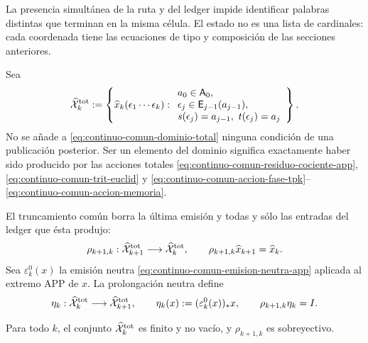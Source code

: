 La presencia simultánea de la ruta y del ledger impide identificar palabras
distintas que terminan en la misma célula.  El estado no es una lista de
cardinales: cada coordenada tiene las ecuaciones de tipo y composición de las
secciones anteriores.

\begin{definition}
\label{def:continuo-comun-dominio-total}
Sea
\begin{equation}
\label{eq:continuo-comun-dominio-total}
 \widehat{\mathcal X}^{\rm tot}_k
 :=\left\{
  \widehat x_k(\epsilon_1\cdots\epsilon_k):
  \begin{array}{l}
   a_0\in\mathsf A_0,\\
   \epsilon_j\in\mathsf E_{j-1}(a_{j-1}),\\
   s(\epsilon_j)=a_{j-1},\ t(\epsilon_j)=a_j
  \end{array}
 \right\}.
\end{equation}
No se añade a \eqref{eq:continuo-comun-dominio-total} ninguna condición de
una publicación posterior.  Ser un elemento del dominio significa
exactamente haber sido producido por las acciones totales
\eqref{eq:continuo-comun-residuo-cociente-app},
\eqref{eq:continuo-comun-trit-euclid} y
\eqref{eq:continuo-comun-accion-fase-tpk}--
\eqref{eq:continuo-comun-accion-memoria}.
\end{definition}

El truncamiento común borra la última emisión y todas y sólo las entradas del
ledger que ésta produjo:
\begin{equation}
\label{eq:continuo-comun-truncamiento-total}
 \rho_{k+1,k}:\widehat{\mathcal X}^{\rm tot}_{k+1}
 \longrightarrow\widehat{\mathcal X}^{\rm tot}_k,
 \qquad
 \rho_{k+1,k}\widehat x_{k+1}
 =\widehat x_k.
\end{equation}
Sea \(\varepsilon^0_k(x)\) la emisión neutra
\eqref{eq:continuo-comun-emision-neutra-app} aplicada al extremo APP de
\(x\).  La prolongación neutra define
\begin{equation}
\label{eq:continuo-comun-seccion-total}
 \eta_k:\widehat{\mathcal X}^{\rm tot}_k
 \longrightarrow\widehat{\mathcal X}^{\rm tot}_{k+1},
 \qquad
 \eta_k(x):=(\varepsilon^0_k(x))_*x,
 \qquad
 \rho_{k+1,k}\eta_k=I.
\end{equation}

\begin{proposition}
\label{prop:continuo-comun-total-finito}
Para todo \(k\), el conjunto
\(\widehat{\mathcal X}^{\rm tot}_k\) es finito y no vacío, y
\(\rho_{k+1,k}\) es sobreyectivo.
\end{proposition}

